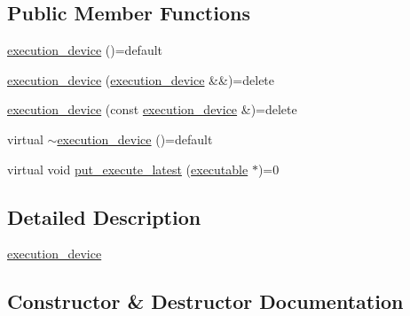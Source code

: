 \subsection*{Public Member Functions}
\begin{DoxyCompactItemize}
\item 
\hyperlink{structactor__zeta_1_1executor_1_1execution__device_a552c067e38d17da26a4b2f41db21db3d}{execution\+\_\+device} ()=default
\item 
\hyperlink{structactor__zeta_1_1executor_1_1execution__device_a4d17ed7f7479e2c49dd6a373ca2bf8b1}{execution\+\_\+device} (\hyperlink{structactor__zeta_1_1executor_1_1execution__device}{execution\+\_\+device} \&\&)=delete
\item 
\hyperlink{structactor__zeta_1_1executor_1_1execution__device_a21ece5bd6bc0cc1ce608f6b9eaa7a49b}{execution\+\_\+device} (const \hyperlink{structactor__zeta_1_1executor_1_1execution__device}{execution\+\_\+device} \&)=delete
\item 
virtual \hyperlink{structactor__zeta_1_1executor_1_1execution__device_a4079ca9f4b13fe247c9da029a7c3a351}{$\sim$execution\+\_\+device} ()=default
\item 
virtual void \hyperlink{structactor__zeta_1_1executor_1_1execution__device_a9e6a0a577c4b85e16af82f228e9612eb}{put\+\_\+execute\+\_\+latest} (\hyperlink{structactor__zeta_1_1executor_1_1executable}{executable} $\ast$)=0
\end{DoxyCompactItemize}


\subsection{Detailed Description}
\hyperlink{structactor__zeta_1_1executor_1_1execution__device}{execution\+\_\+device} 

\subsection{Constructor \& Destructor Documentation}
\mbox{\label{structactor__zeta_1_1executor_1_1execution__device_a552c067e38d17da26a4b2f41db21db3d}} 
